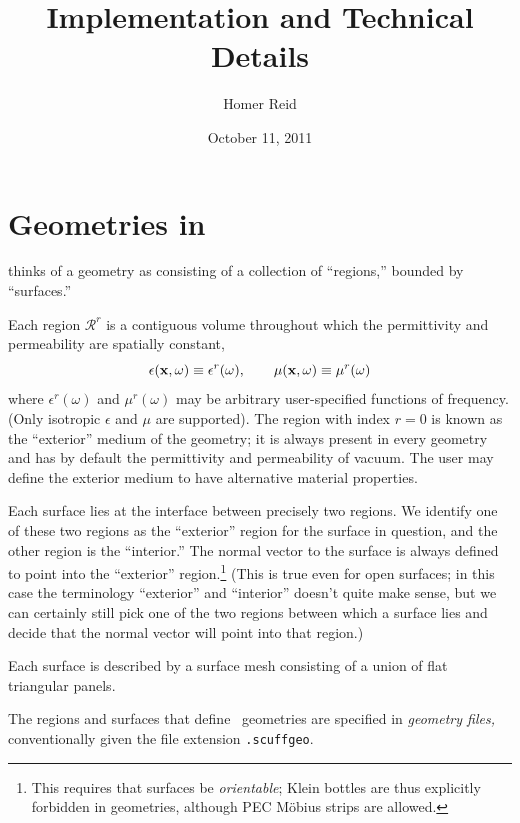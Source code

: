 \documentclass[letterpaper]{article}
\title {\lss Implementation and Technical Details}
\author {Homer Reid}
\date {October 11, 2011}
\begin{document}
\pagestyle{myheadings}
\maketitle

\tableofcontents

\newpage
\section{Geometries in \lss}

\lss thinks of a geometry as consisting of a collection
of ``regions,'' bounded by ``surfaces.'' 

Each region $\mathcal{R}^r$ is a contiguous volume
throughout which the permittivity and permeability are 
spatially constant,
$$ \epsilon(\mathbf{x}, \omega) \equiv \epsilon^r(\omega), \qquad
   \mu(\mathbf{x}, \omega)      \equiv \mu^r(\omega)
$$
where $\epsilon^r(\omega)$ and $\mu^r(\omega)$ may
be arbitrary user-specified functions of frequency. 
(Only isotropic $\epsilon$ and $\mu$ are supported).
The region with index $r=0$ is known as the 
``exterior'' medium of the \lss geometry; it is 
always present in every \lss geometry and has by 
default the permittivity and permeability of vacuum. 
The user may define the exterior medium to have 
alternative material properties.

Each surface lies at the interface between precisely two 
regions. We identify one of these two regions as 
the ``exterior'' region for the surface in question,
and the other region is the ``interior.'' The normal 
vector to the surface is always defined to point into 
the ``exterior'' region.\footnote{This requires that 
surfaces be \textit{orientable}; Klein bottles are thus 
explicitly forbidden in \lss geometries, although PEC 
M\"obius strips are allowed.} (This is true even for 
open surfaces; in this case the terminology ``exterior'' 
and ``interior'' doesn't quite make sense, but we can 
certainly still pick one of the two regions between
which a surface lies and decide that the normal vector
will point into that region.)


Each surface is described by a surface mesh consisting of 
a union of flat triangular panels. 

The regions and surfaces that define \lss\, geometries are 
specified in \textit{geometry files,} conventionally given the 
file extension \texttt{.scuffgeo}.
\end{document}
